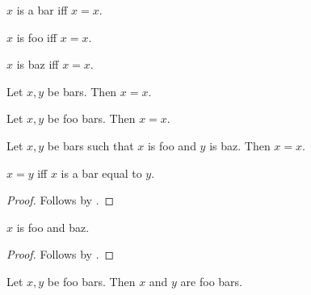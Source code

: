 \begin{definition}\label{bar}
    $x$ is a bar iff $x = x$.
\end{definition}

\begin{definition}\label{foo}
    $x$ is foo iff $x = x$.
\end{definition}

\begin{definition}\label{baz}
    $x$ is baz iff $x = x$.
\end{definition}

\begin{proposition}\label{nouns}
    Let $x, y$ be bars.
    Then $x = x$.
\end{proposition}

\begin{proposition}\label{adj_nouns}
    Let $x, y$ be foo bars.
    Then $x = x$.
\end{proposition}


\begin{proposition}\label{nouns_suchthat}
    Let $x, y$ be bars such that $x$ is foo and $y$ is baz.
    Then $x = x$.
\end{proposition}


\begin{proposition}\label{noun_verb}
    $x = y$ iff $x$ is a bar equal to $y$.
\end{proposition}
\begin{proof}
    Follows by .
\end{proof}


\begin{proposition}\label{adjs}
    $x$ is foo and baz.
\end{proposition}
\begin{proof}
    Follows by .
\end{proof}

\begin{proposition}\label{are_nouns}
    Let $x, y$ be foo bars.
    Then $x$ and $y$ are foo bars.
\end{proposition}
